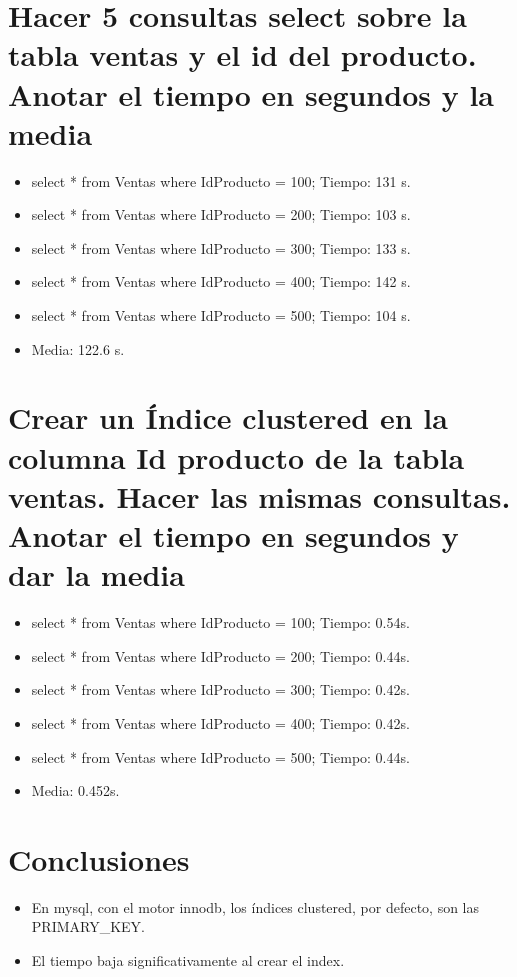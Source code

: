 \documentclass[a4paper,12pt]{article}
\begin{document}
  \section{Hacer 5 consultas select sobre la tabla ventas y el id del producto. Anotar el tiempo en segundos y la media}
  
  \begin{itemize}
   \item select * from Ventas where IdProducto = 100; Tiempo: 131 s.
   \item select * from Ventas where IdProducto = 200; Tiempo: 103 s.
   \item select * from Ventas where IdProducto = 300; Tiempo: 133 s.
   \item select * from Ventas where IdProducto = 400; Tiempo: 142 s.
   \item select * from Ventas where IdProducto = 500; Tiempo: 104 s.
   \item Media: 122.6 s.
  \end{itemize}

  \section{Crear un Índice clustered en la columna Id producto de la tabla ventas. Hacer las mismas consultas. Anotar el tiempo
  en segundos y dar la media}
  
  \begin{itemize}
   \item select * from Ventas where IdProducto = 100; Tiempo: 0.54s.
   \item select * from Ventas where IdProducto = 200; Tiempo: 0.44s.
   \item select * from Ventas where IdProducto = 300; Tiempo: 0.42s.
   \item select * from Ventas where IdProducto = 400; Tiempo: 0.42s.
   \item select * from Ventas where IdProducto = 500; Tiempo: 0.44s.
   \item Media: 0.452s.
  \end{itemize}
  
  \section{Conclusiones}
  
  \begin{itemize}
   \item En mysql, con el motor innodb, los índices clustered, por defecto, son las PRIMARY\_KEY.
   \item El tiempo baja significativamente al crear el index.
  \end{itemize}
  
\end{document}
